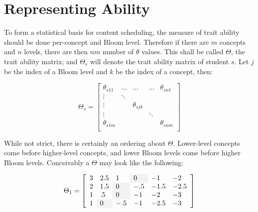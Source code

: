 \section{Representing Ability}

To form a statistical basis for content scheduling, the measure of trait
ability should be done per-concept and Bloom level.  Therefore if there are $m$
concepts and $n$ levels, there are then $nm$ number of $\theta$ values.  This
shall be called $\Theta$, the trait ability matrix; and $\Theta_s$ will denote
the trait ability matrix of student $s$.  Let $j$ be the index of a Bloom level
and $k$ be the index of a concept, then:

\begin{equation}
\Theta_s =\left[
         \begin{array}{lllll}
              \theta_{s11} & \ldots       & \ldots       & \ldots & \theta_{sn1}  \\
              \vdots       & \ddots       &              &        &               \\
              \vdots       &              & \theta_{sjk} &        &               \\
              \vdots       &              &              & \ddots &               \\
              \theta_{s1m} &              &              &        & \theta_{snm}  \\
         \end{array}
       \right]
\end{equation}

While not strict, there is certainly an ordering about $\Theta$. Lower-level
concepts come before higher-level concepts, and lower Bloom levels come before
higher Bloom levels.  Conceivably a $\Theta$ may look like the following:

\begin{equation}
\Theta_1 =\left[
         \begin{array}{llllll}
             3 & 2.5 & 1   & \y0 & -1     & -2   \\
             2 & 1.5 & \y0 & -.5 & -1.5   & -2.5 \\
             1 &  .5 & \y0 & -1  & -2     & -3   \\
             1 & \y0 & -.5 & -1  & -2.5   & -3   \\
         \end{array}
       \right]
\end{equation}
\vspace{12pt}

